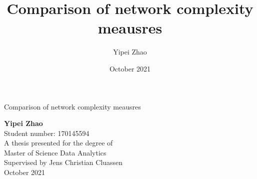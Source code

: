 \documentclass[12pt]{article}
\title{Comparison of network complexity meausres}
\author{Yipei Zhao}
\date{October 2021}
\begin{document}
\begin{titlepage}
    \begin{center}
        \vspace*{1cm}
 
        {\Huge Comparison of network complexity meausres}
 
        \vspace{0.5cm}
         
             
        \vspace{1.5cm}
 
        \textbf{Yipei Zhao}\\
        Student number: 170145594\\
        A thesis presented for the degree of\\
        Master of Science Data Analytics\\
        {\large Supervised by Jens Christian Cluassen}\\
        October 2021
 
        \vfill
             

    \end{center}
 \end{titlepage}

\tableofcontents
\pagebreak
\renewcommand{\familydefault}{}
\end{document}
